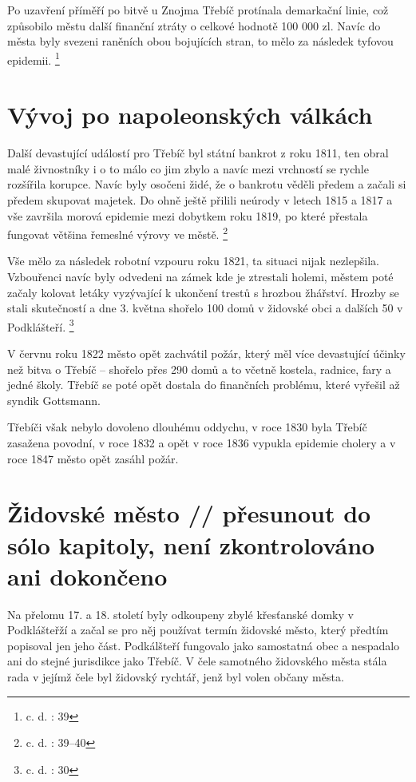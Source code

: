 \documentclass[a4paper,oneside,12p]{report}
\begin{document}
Po uzavření příměří po bitvě u Znojma Třebíč protínala demarkační linie, což způsobilo městu další finanční ztráty o celkové hodnotě 100 000 zl.
Navíc do města byly svezeni raněních obou bojujících stran, to mělo za následek tyfovou epidemii. \footnote{c. d. : 39}

\section{Vývoj po napoleonských válkách}

Další devastující událostí pro Třebíč byl státní bankrot z roku 1811, ten obral malé živnostníky i o to málo co jim zbylo a navíc mezi vrchností se rychle rozšířila korupce.
Navíc byly osočeni židé, že o bankrotu věděli předem a začali si předem skupovat majetek.
Do ohně ještě přilili neúrody v letech 1815 a 1817 a vše završila morová epidemie mezi dobytkem roku 1819, po které přestala fungovat většina řemeslné výrovy ve městě. \footnote{c. d. : 39--40}

Vše mělo za následek robotní vzpouru roku 1821, ta situaci nijak nezlepšila.
Vzbouřenci navíc byly odvedeni na zámek kde je ztrestali holemi, městem poté začaly kolovat letáky vyzývající k ukončení trestů s hrozbou žhářství.
Hrozby se stali skutečností a dne 3. května shořelo 100 domů v židovské obci a dalších 50 v Podklášteří. \footnote{c. d. : 30}

V červnu roku 1822 město opět zachvátil požár, který měl více devastující účinky než bitva o Třebíč -- shořelo přes 290 domů a to včetně kostela, radnice, fary a jedné školy.
Třebíč se poté opět dostala do finančních problému, které vyřešil až syndik Gottsmann.

Třebíči však nebylo dovoleno dlouhému oddychu, v roce 1830 byla Třebíč zasažena povodní, v roce 1832 a opět v roce 1836 vypukla epidemie cholery a v roce 1847 město opět zasáhl požár.

\section{Židovské město // přesunout do sólo kapitoly, není zkontrolováno ani dokončeno}

Na přelomu 17. a 18. století byly odkoupeny zbylé křesťanské domky v Podklášteřží a začal se pro něj používat termín židovské město, který předtím popisoval jen jeho část.
Podkálšteří fungovalo jako samostatná obec a nespadalo ani do stejné jurisdikce jako Třebíč.
V čele samotného židovského města stála rada v jejímž čele byl židovský rychtář, jenž byl volen občany města.
\end{document}
